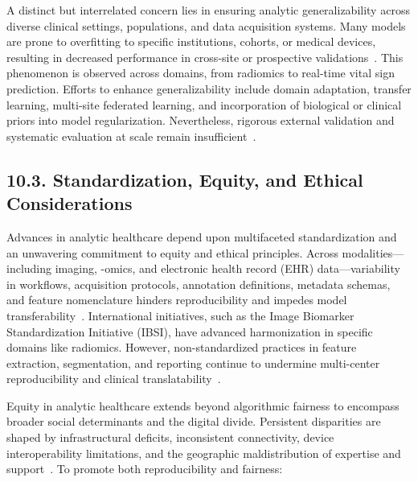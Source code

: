 \documentclass[11pt]{article}
\begin{document}
A distinct but interrelated concern lies in ensuring analytic generalizability across diverse clinical settings, populations, and data acquisition systems. Many models are prone to overfitting to specific institutions, cohorts, or medical devices, resulting in decreased performance in cross-site or prospective validations~\cite{ref28,ref32,ref53,ref65,ref73,ref98,ref106}. This phenomenon is observed across domains, from radiomics to real-time vital sign prediction. Efforts to enhance generalizability include domain adaptation, transfer learning, multi-site federated learning, and incorporation of biological or clinical priors into model regularization. Nevertheless, rigorous external validation and systematic evaluation at scale remain insufficient~\cite{ref28,ref70,ref73,ref78,ref80,ref98,ref99,ref106}.

\subsection{10.3. Standardization, Equity, and Ethical Considerations}

Advances in analytic healthcare depend upon multifaceted standardization and an unwavering commitment to equity and ethical principles. Across modalities—including imaging, -omics, and electronic health record (EHR) data—variability in workflows, acquisition protocols, annotation definitions, metadata schemas, and feature nomenclature hinders reproducibility and impedes model transferability~\cite{ref44,ref45,ref46,ref50,ref54,ref55,ref60,ref61,ref62,ref63,ref64,ref65,ref74,ref75,ref78,ref5,ref44,ref46,ref50,ref54,ref53,ref55,ref61,ref62,ref64,ref65,ref66,ref67,ref71,ref72,ref74,ref75,ref76,ref78,ref79,ref80,ref84,ref90,ref106}. International initiatives, such as the Image Biomarker Standardization Initiative (IBSI), have advanced harmonization in specific domains like radiomics. However, non-standardized practices in feature extraction, segmentation, and reporting continue to undermine multi-center reproducibility and clinical translatability~\cite{ref46,ref54,ref55,ref65,ref74,ref75,ref78,ref90,ref106}.

Equity in analytic healthcare extends beyond algorithmic fairness to encompass broader social determinants and the digital divide. Persistent disparities are shaped by infrastructural deficits, inconsistent connectivity, device interoperability limitations, and the geographic maldistribution of expertise and support~\cite{ref61,ref63,ref65,ref69,ref78,ref79,ref82,ref84,ref85,ref90,ref106}. To promote both reproducibility and fairness:
\end{document}
